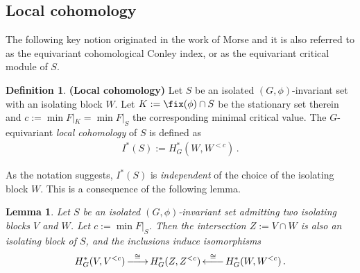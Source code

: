 \documentclass[11pt,a4paper,reqno]{article}
\DeclareMathOperator*{\ttoup}{\llongrightarrow}
\DeclareMathOperator*{\leftttoup}{\llongleftarrow}
\DeclareRobustCommand{\llongrightarrow}{\relbar\joinrel\relbar\joinrel\rightarrow}
\DeclareRobustCommand{\llongleftarrow}{\leftarrow\joinrel\relbar\joinrel\relbar}
\numberwithin{equation}{section}
\newtheorem{lemma}[theorem]{Lemma}
\theoremstyle{definition}
\newtheorem{definition}[theorem]{Definition}
\begin{document}
        


\subsection{Local cohomology}\label{s:local cohomoloy}

The following key notion originated in the 
work of Morse \cite{Morse:1996aa} and it is also referred to  as the equivariant cohomological Conley index, or as the equivariant critical module of $S$.

\begin{definition}
{\bf (Local cohomology)}
Let $S$ be an isolated $(G,\phi)$-invariant set with an isolating block $ W$. Let $K:=\fix(\phi)\cap S$ be the stationary set therein and $c:=\min F|_K=\min F|_{S}$ the corresponding minimal critical value. The $G$-equivariant \emph{local cohomology} of $S$ is defined as
\begin{align*}
    I^*(S)
    :=
    H^*_G(W,W^{<c}) \, . 
\end{align*}
\end{definition}
 As the notation suggests, $I^*(S)$ is {\it independent} of the choice of the isolating block $W$. This is a consequence of the following lemma.

\begin{lemma}\label{l:local_cohomology_well_posed}
Let $S$ be an isolated $(G,\phi)$-invariant set admitting two isolating blocks $V$ and $W$. Let $c:=\min F|_S$. Then the intersection $Z:=V\cap W$ is also an isolating block of $S$, and the inclusions induce isomorphisms
\begin{equation}
\label{isom3}
H^*_G(V,V^{<c}) \ttoup^{\cong}
H^*_G(Z,Z^{<c})
\leftttoup^{\cong}
H^*_G(W,W^{<c}) \, .
\end{equation}
\end{lemma}
\end{document}
